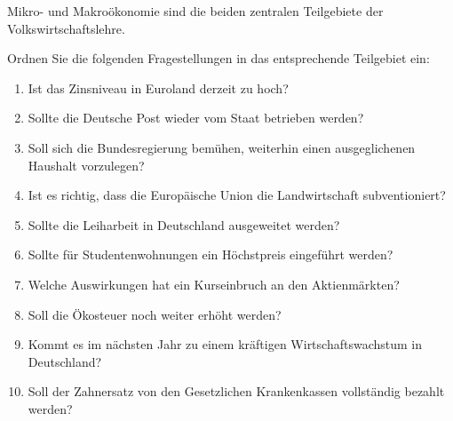 Mikro- und Makroökonomie sind die beiden zentralen Teilgebiete der Volkswirtschaftslehre.

Ordnen Sie die folgenden Fragestellungen in das entsprechende Teilgebiet ein:
\begin{enumerate}
    \item Ist das Zinsniveau in Euroland derzeit zu hoch?
    \item Sollte die Deutsche Post wieder vom Staat betrieben werden?
    \item Soll sich die Bundesregierung bemühen, weiterhin einen ausgeglichenen Haushalt vorzulegen?
    \item Ist es richtig, dass die Europäische Union die Landwirtschaft subventioniert?
    \item Sollte die Leiharbeit in Deutschland ausgeweitet werden?
    \item Sollte für Studentenwohnungen ein Höchstpreis eingeführt werden?
    \item Welche Auswirkungen hat ein Kurseinbruch an den Aktienmärkten?
    \item Soll die Ökosteuer noch weiter erhöht werden?
    \item Kommt es im nächsten Jahr zu einem kräftigen Wirtschaftswachstum in Deutschland?
    \item Soll der Zahnersatz von den Gesetzlichen Krankenkassen vollständig bezahlt werden?
\end{enumerate}

